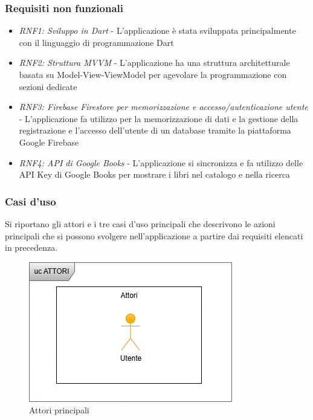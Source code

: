 \documentclass{article}
\begin{document}
\subsubsection{Requisiti non funzionali}
\begin{itemize}[label=\textendash]
    \item \textit{RNF1: Sviluppo in Dart} - L'applicazione è stata sviluppata principalmente con il linguaggio di programmazione Dart
    \item \textit{RNF2: Struttura MVVM} - L'applicazione ha una struttura architetturale basata su Model-View-ViewModel per agevolare la programmazione con sezioni dedicate
    \item \textit{RNF3: Firebase Firestore per memorizzazione e accesso/autenticazione utente} - L'applicazione fa utilizzo per la memorizzazione di dati e la gestione della registrazione e l'accesso dell'utente di un database tramite la piattaforma Google Firebase
    \item \textit{RNF4: API di Google Books} - L'applicazione si sincronizza e fa utilizzo delle API Key di Google Books per mostrare i libri nel catalogo e nella ricerca
\end{itemize}

\subsubsection{Casi d'uso}
Si riportano gli attori e i tre casi d'uso principali che descrivono le azioni principali che si possono svolgere nell'applicazione a partire dai requisiti elencati in precedenza.

\begin{figure}[H]
  \centering
  \includegraphics[width=.6\linewidth]{cu_attori.png}
  \caption{Attori principali}
  \label{fig:sitemap}
\end{figure}
\end{document}
